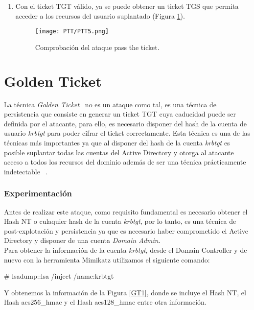 \begin{enumerate}
\item Con el ticket TGT válido, ya se puede obtener un ticket TGS que permita acceder a los recursos del usuario suplantado (Figura \ref{PTT5}).
\begin{figure}[H] %
\begin{center}
\texttt{[image: PTT/PTT5.png]}
\end{center}
\caption{Comprobación del ataque pass the ticket.}
\label{PTT5}
\end{figure}

\end{enumerate}

\section{Golden Ticket}

La técnica {\it Golden Ticket}~\cite{Capitulo5:Kerberos} no es un ataque como tal, es una técnica de persistencia que consiste en generar un ticket TGT cuya caducidad puede ser definida por el atacante, para ello, es necesario disponer del hash de la cuenta de usuario {\it krbtgt} para poder cifrar el ticket correctamente. Esta técnica es una de las técnicas más importantes ya que al disponer del hash de la cuenta {\it krbtgt} es posible suplantar todas las cuentas del Active Directory y otorga al atacante acceso a todos los recursos del dominio además de ser una técnica prácticamente indetectable ~\cite{Capitulo5:Golden}.

\subsubsection{Experimentación}

Antes de realizar este ataque, como requisito fundamental es necesario obtener el Hash NT o culaquier hash de la cuenta {\it krbtgt}, por lo tanto, es una técnica de post-explotación y persistencia ya que es necesario haber comprometido el Active Directory y disponer de una cuenta {\it Domain Admin}. \\

Para obtener la información de la cuenta {\it krbtgt}, desde el Domain Controller y de nuevo con la herramienta Mimikatz utilizamos el siguiente comando:
\begin{listing}[style=consola, numbers=none]
# lsadump::lsa /inject /name:krbtgt
\end{listing}

Y obtenemos la información de la Figura \ref{GT1}, donde se incluye el Hash NT, el Hash aes256\_hmac y el Hash aes128\_hmac entre otra información. 


